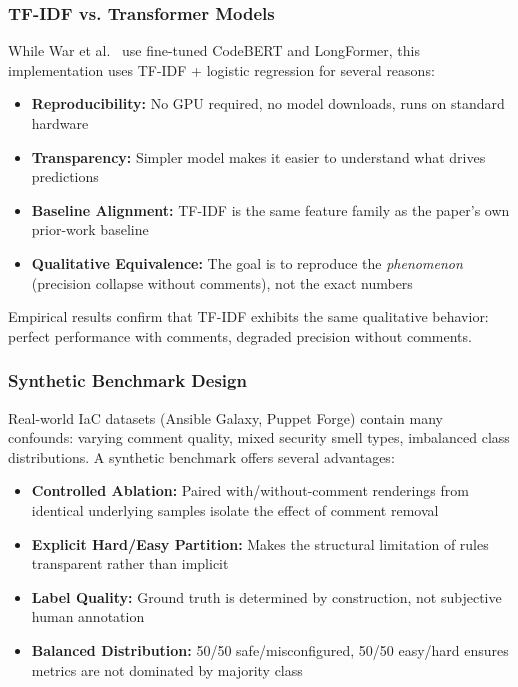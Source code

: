 \subsubsection{TF-IDF vs. Transformer Models}

While War et al.~\cite{War25} use fine-tuned CodeBERT and LongFormer, this implementation uses TF-IDF + logistic regression for several reasons:

\begin{itemize}
  \item \textbf{Reproducibility:} No GPU required, no model downloads, runs on standard hardware
  \item \textbf{Transparency:} Simpler model makes it easier to understand what drives predictions
  \item \textbf{Baseline Alignment:} TF-IDF is the same feature family as the paper's own prior-work baseline
  \item \textbf{Qualitative Equivalence:} The goal is to reproduce the \emph{phenomenon} (precision collapse without comments), not the exact numbers
\end{itemize}

Empirical results confirm that TF-IDF exhibits the same qualitative behavior: perfect performance with comments, degraded precision without comments.

\subsubsection{Synthetic Benchmark Design}

Real-world IaC datasets (Ansible Galaxy, Puppet Forge) contain many confounds: varying comment quality, mixed security smell types, imbalanced class distributions. A synthetic benchmark offers several advantages:

\begin{itemize}
  \item \textbf{Controlled Ablation:} Paired with/without-comment renderings from identical underlying samples isolate the effect of comment removal
  \item \textbf{Explicit Hard/Easy Partition:} Makes the structural limitation of rules transparent rather than implicit
  \item \textbf{Label Quality:} Ground truth is determined by construction, not subjective human annotation
  \item \textbf{Balanced Distribution:} 50/50 safe/misconfigured, 50/50 easy/hard ensures metrics are not dominated by majority class
\end{itemize}

